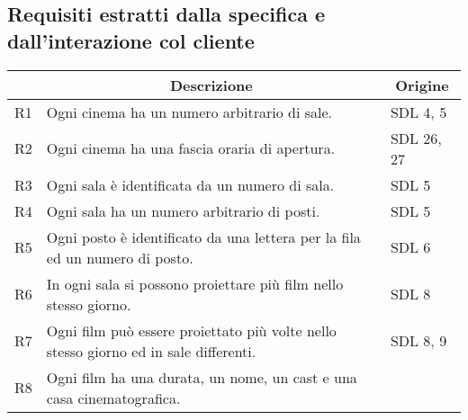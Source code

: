 \pagebreak

\subsection*{Requisiti estratti dalla specifica e dall'interazione col cliente}
%
%

\begin{longtable}{|p{0.8cm}|p{13.4cm}|p{2.1cm}|}
      \hline
      \rowcolor{tblhdrcolor}
      \multicolumn{1}{|c|}{\textbf{Id}}                                       &
      \multicolumn{1}{|c|}{\textbf{Descrizione}}                              &
      \multicolumn{1}{|c|}{\textbf{Origine}}
      \\\hline
      R1                                                                      &
      Ogni cinema ha un numero arbitrario di sale.                            &
      SDL 4, 5
      \\\hline
      R2                                                                      &
      Ogni cinema ha una fascia oraria di apertura.                           &
      SDL 26, 27
      \\\hline
      R3                                                                      &
      Ogni sala è identificata da un numero di sala.                          &
      SDL 5
      \\\hline
      R4                                                                      &
      Ogni sala ha un numero arbitrario di posti.                             &
      SDL 5
      \\\hline
      R5                                                                      &
      Ogni posto è identificato da una lettera per la fila ed un numero
      di posto.                                                               &
      SDL 6
      \\\hline
      R6                                                                      &
      In ogni sala si possono proiettare più film nello stesso giorno.        &
      SDL 8
      \\\hline
      R7                                                                      &
      Ogni film può essere proiettato più volte nello stesso giorno ed
      in sale differenti.                                                     &
      SDL 8, 9
      \\\hline
      R8                                                                      &
      Ogni film ha una durata, un nome, un cast e una casa cinematografica.   &

\end{longtable}
